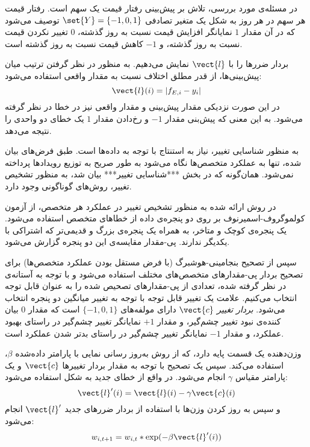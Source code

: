 
در مسئله‌ی مورد بررسی، تلاش بر پیش‌بینی رفتار قیمت یک سهم است. رفتار قیمت هر سهم در هر روز به شکل یک متغیر تصادفی 
$\set{Y} = \{ -1, 0, 1 \}$ 
توصیف می‌شود که در آن مقدار 
$1$ 
نمایانگر افزایش قیمت نسبت به روز گذشته، 
$0$ 
تغییر نکردن قیمت نسبت به روز گذشته، و 
$-1$ 
کاهش قیمت نسبت به روز گذشته است.

بردار ضررها را با 
$\vect{l}$ 
نمایش می‌دهیم. به منظور در نظر گرفتن ترتیب میان پیش‌بینی‌ها، از قدر مطلق اختلاف نسبت به مقدار واقعی استفاده می‌شود:
\[
\vect{l}(i) = | f_{E,i} - y_i |
\]
در این صورت نزدیکی مقدار پیش‌بینی و مقدار واقعی نیز در خطا در نظر گرفته می‌شود. به این معنی که پیش‌بنی مقدار 
$-1$ 
و رخ‌دادن مقدار 
$1$ 
یک خطای دو واحدی را نتیجه می‌دهد.



به منظور شناسایی تغییر، نیاز به استنتاج با توجه به داده‌ها است. طبق فرض‌های بیان شده، تنها به عملکرد متخصص‌ها نگاه می‌شود به طور صریح به توزیع رویدادها پرداخته نمی‌شود. همان‌گونه که در بخش ***شناسایی تغییر*** بیان شد، به منظور تشخیص تغییر، روش‌های گوناگونی وجود دارد.

در روش ارائه شده به منظور تشخیص تغییر در عملکرد هر متخصص، از آزمون کولموگروف-اسمیرنوف
بر روی دو پنجره‌ی داده از خطاهای متخصص استفاده می‌شود. یک پنجره‌ی کوچک و متاخر، به همراه یک پنجره‌ی بزرگ و قدیمی‌تر که اشتراکی با یکدیگر ندارند. پی-مقدار
مقایسه‌ی این دو پنجره گزارش می‌شود.


سپس از تصحیح بنجامینی-هوشبرگ
(با فرض مستقل بودن عملکرد متخصص‌ها) برای تصحیح بردار پی-مقدارهای متخصص‌های مختلف استفاده می‌شود و با توجه به آستانه‌ی در نظر گرفته شده، تعدادی از پی-مقدارهای تصحیص شده را به عنوان قابل توجه انتخاب می‌کنیم. علامت یک تغییر قابل توجه با توجه به تغییر میانگین دو پنجره انتخاب می‌شود.
\textit{
بردار تغییر
} 
$\vect{c}$ 
دارای مولفه‌های 
$\{ -1, 0, 1 \}$ 
است که مقدار 
$0$ 
بیان کننده‌ی نبود تغییر چشم‌گیر، و مقدار 
$+1$ 
نمایانگر تغییر چشم‌گیر در راستای بهبود عملکرد، و مقدار 
$-1$ 
نمایانگر تغییر چشم‌گیر در راستای بدتر شدن عملکرد است.




وزن‌دهنده یک قسمت پایه دارد، که از روش به‌روز رسانی نمایی با پارامتر داده‌شده 
$\beta$، 
استفاده می‌کند. سپس یک تصحیح با توجه به مقدار بردار تغییرها 
$\vect{c}$ 
و یک پارامتر مقیاس 
$\gamma$ 
انجام می‌شود. در واقع از خطای جدید به شکل استفاده می‌شود:
\[
\vect{l}^{\prime}(i) = \vect{l}(i) - \gamma \vect{c}(i)
\]
و سپس به روز کردن وزن‌ها با استفاده از بردار ضررهای جدید 
$\vect{l}^\prime$ 
انجام می‌شود:
\[
w_{i,t+1} = w_{i,t} * \exp( -\beta \vect{l}^{\prime}(i) )
\]

